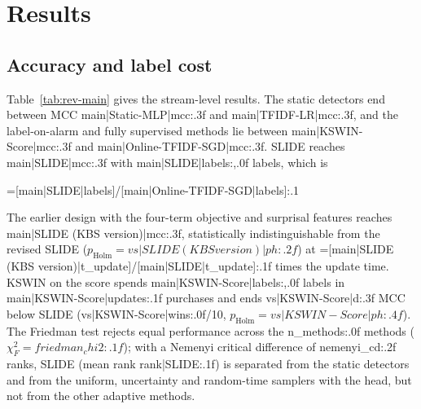 \section{Results}\label{sec:results}

\subsection{Accuracy and label cost}\label{sec:main}
Table~\ref{tab:rev-main} gives the stream-level results. The static detectors end between MCC {{main|Static-MLP|mcc:.3f}} and {{main|TFIDF-LR|mcc:.3f}}, and the label-on-alarm and fully supervised methods lie between {{main|KSWIN-Score|mcc:.3f}} and {{main|Online-TFIDF-SGD|mcc:.3f}}. SLIDE reaches {{main|SLIDE|mcc:.3f}} with {{main|SLIDE|labels:,.0f}} labels, which is {{=[main|SLIDE|labels]/[main|Online-TFIDF-SGD|labels]:.1%



The earlier design with the four-term objective and surprisal features reaches {{main|SLIDE (KBS version)|mcc:.3f}}, statistically indistinguishable from the revised SLIDE ($p_{\mathrm{Holm}}={{vs|SLIDE (KBS version)|ph:.2f}}$) at {{=[main|SLIDE (KBS version)|t_update]/[main|SLIDE|t_update]:.1f}} times the update time. KSWIN on the score spends {{main|KSWIN-Score|labels:,.0f}} labels in {{main|KSWIN-Score|updates:.1f}} purchases and ends {{vs|KSWIN-Score|d:.3f}} MCC below SLIDE ({{vs|KSWIN-Score|wins:.0f}}/10, $p_{\mathrm{Holm}}={{vs|KSWIN-Score|ph:.4f}}$). The Friedman test rejects equal performance across the {{n_methods:.0f}} methods ($\chi^2_F={{friedman_chi2:.1f}}$); with a Nemenyi critical difference of {{nemenyi_cd:.2f}} ranks, SLIDE (mean rank {{rank|SLIDE:.1f}}) is separated from the static detectors and from the uniform, uncertainty and random-time samplers with the head, but not from the other adaptive methods.

}}
